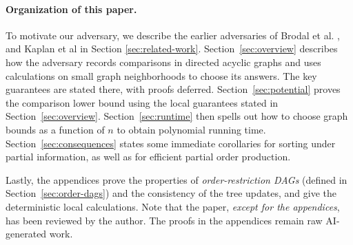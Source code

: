 \paragraph{Organization of this paper.}
To motivate our adversary, we describe the earlier adversaries of Brodal et al. \cite{brodal}, and Kaplan et al \cite{kzz} in Section \ref{sec:related-work}.
Section~\ref{sec:overview} describes how the adversary records comparisons
in directed acyclic graphs and uses calculations on small graph
neighborhoods to choose its answers. The key guarantees are stated there,
with proofs deferred.
Section~\ref{sec:potential} proves the comparison lower bound using the local
guarantees stated in Section~\ref{sec:overview}.
Section~\ref{sec:runtime} then spells out how to choose graph bounds as a function of $n$ to obtain polynomial running time.
Section~\ref{sec:consequences} states some immediate corollaries for sorting under partial information, as well as for efficient partial order production.

Lastly, the appendices prove the properties of \emph{order-restriction DAGs}
(defined in Section~\ref{sec:order-dags}) and the consistency of the tree
updates, and give the deterministic local calculations. Note that the
paper, \emph{except for the appendices}, has been reviewed by the author.
The proofs in the appendices remain raw AI-generated work.
